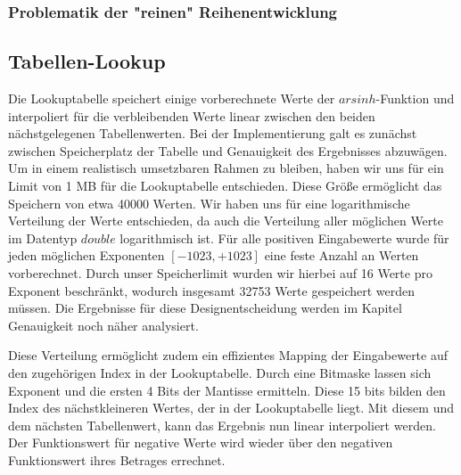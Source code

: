 \documentclass[course=erap] {aspdoc}
\begin{document}
    
    \subsubsection{Problematik der "reinen" Reihenentwicklung}

    
    \subsection{Tabellen-Lookup}
    Die Lookuptabelle speichert einige vorberechnete Werte der $arsinh$-Funktion und interpoliert für die verbleibenden Werte linear zwischen den beiden nächstgelegenen Tabellenwerten.
    Bei der Implementierung galt es zunächst zwischen Speicherplatz der Tabelle und Genauigkeit des Ergebnisses abzuwägen. Um in einem realistisch umsetzbaren Rahmen zu bleiben, haben wir uns für ein Limit von 1 MB für die Lookuptabelle entschieden. Diese Größe ermöglicht das Speichern von etwa 40000 Werten. Wir haben uns für eine logarithmische Verteilung der Werte entschieden, da auch die Verteilung aller möglichen Werte im Datentyp $double$ logarithmisch ist. Für alle positiven Eingabewerte wurde für jeden möglichen Exponenten $[-1023, +1023]$ eine feste Anzahl an Werten vorberechnet. Durch unser Speicherlimit wurden wir hierbei auf 16 Werte pro Exponent beschränkt, wodurch insgesamt 32753 Werte gespeichert werden müssen. Die Ergebnisse für diese Designentscheidung werden im Kapitel Genauigkeit noch näher analysiert.
    
    Diese Verteilung ermöglicht zudem ein effizientes Mapping der Eingabewerte auf den zugehörigen Index in der Lookuptabelle. Durch eine Bitmaske lassen sich Exponent und die ersten 4 Bits der Mantisse ermitteln. Diese 15 bits bilden den Index des nächstkleineren Wertes, der in der Lookuptabelle liegt. Mit diesem und dem nächsten Tabellenwert, kann das Ergebnis nun linear interpoliert werden. Der Funktionswert für negative Werte wird wieder über den negativen Funktionswert ihres Betrages errechnet.
    
\end{document}

